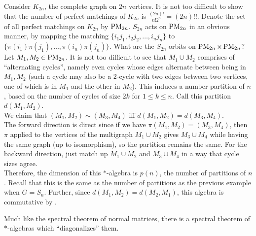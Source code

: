 	\begin{fex}
		Consider $K_{2n}$, the complete graph on $2n$ vertices. It is not too difficult to show that the number of perfect matchings of $K_{2n}$ is $\frac{(2n)!}{n!2^n} = (2n)!!$. Denote the set of all perfect matchings on $K_{2n}$ by $\operatorname{PM}_{2n}$. $S_{2n}$ acts on $\operatorname{PM}_{2n}$ in an obvious manner, by mapping the matching $\{i_1j_1,i_2j_2,\ldots,i_nj_n\}$ to $\{\pi(i_1)\pi(j_1),\ldots,\pi(i_n)\pi(j_n)\}$. What are the $S_{2n}$ orbits on $\operatorname{PM}_{2n} \times \operatorname{PM}_{2n}$?\\
		Let $M_1,M_2 \in \operatorname{PM}_{2n}$. It is not too difficult to see that $M_1 \cup M_2$ comprises of ``alternating cycles'', namely even cycles whose edges alternate between being in $M_1,M_2$ (such a cycle may also be a $2$-cycle with two edges between two vertices, one of which is in $M_1$ and the other in $M_2$).  This induces a number partition of $n$, based on the number of cycles of size $2k$ for $1 \le k \le n$. Call this partition $d(M_1,M_2)$.\\
		
		We claim that $(M_1,M_2) \sim (M_3,M_4)$ iff $d(M_1,M_2) = d(M_3,M_4)$.\\
		The forward direction is direct since if we have $\pi (M_1,M_2) = (M_3,M_4)$, then $\pi$ applied to the vertices of the multigraph $M_1 \cup M_2$ gives $M_3 \cup M_4$ while having the same graph (up to isomorphism), so the partition remains the same. For the backward direction, just match up $M_1 \cup M_2$ and $M_3 \cup M_4$ in a way that cycle sizes agree.\\

		Therefore, the dimension of this $*$-algebra is $p(n)$, the number of partitions of $n$. Recall that this is the same as the number of partitions as the previous example when $G = S_n$. Further, since $d(M_1,M_2) = d(M_2,M_1)$, this algebra is commutative by .
	\end{fex}

	Much like the spectral theorem of normal matrices, there is a spectral theorem of $*$-algebras which ``diagonalizes'' them.

